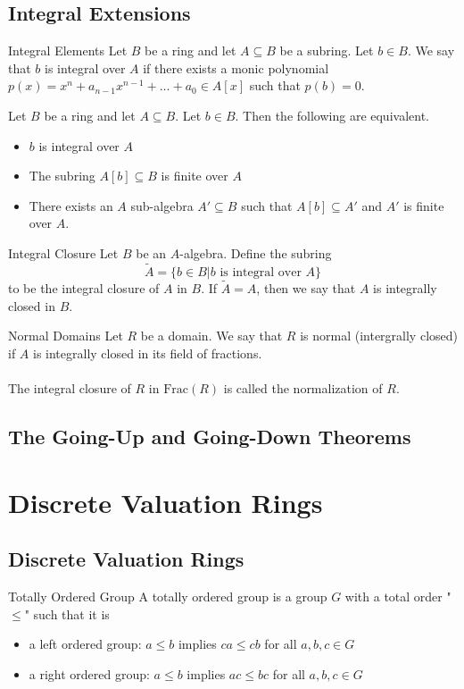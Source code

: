 \documentclass[a4paper]{article}
\begin{document}
\subsection{Integral Extensions}
\begin{defn}{Integral Elements}{} Let $B$ be a ring and let $A\subseteq B$ be a subring. Let $b\in B$. We say that $b$ is integral over $A$ if there exists a monic polynomial $p(x)=x^n+a_{n-1}x^{n-1}+\dots+a_0\in A[x]$ such that $p(b)=0$. 
\end{defn}

\begin{prp}{}{} Let $B$ be a ring and let $A\subseteq B$. Let $b\in B$. Then the following are equivalent. 
\begin{itemize}
\item $b$ is integral over $A$
\item The subring $A[b]\subseteq B$ is finite over $A$
\item There exists an $A$ sub-algebra $A'\subseteq B$ such that $A[b]\subseteq A'$ and $A'$ is finite over $A$. 
\end{itemize}
\end{prp}

\begin{defn}{Integral Closure}{} Let $B$ be an $A$-algebra. Define the subring $$\tilde{A}=\{b\in B|b\text{ is integral over }A\}$$ to be the integral closure of $A$ in $B$. If $\tilde{A}=A$, then we say that $A$ is integrally closed in $B$. 
\end{defn}

\begin{defn}{Normal Domains}{} Let $R$ be a domain. We say that $R$ is normal (intergrally closed) if $A$ is integrally closed in its field of fractions. \\~\\
The integral closure of $R$ in $\text{Frac}(R)$ is called the normalization of $R$. 
\end{defn}

\subsection{The Going-Up and Going-Down Theorems}


\pagebreak
\section{Discrete Valuation Rings}
\subsection{Discrete Valuation Rings}
\begin{defn}{Totally Ordered Group}{} A totally ordered group is a group $G$ with a total order "$\leq$" such that it is
\begin{itemize}
\item a left ordered group: $a\leq b$ implies $ca\leq cb$ for all $a,b,c\in G$
\item a right ordered group: $a\leq b$ implies $ac\leq bc$ for all $a,b,c\in G$
\end{itemize}
\end{defn}
\end{document}

